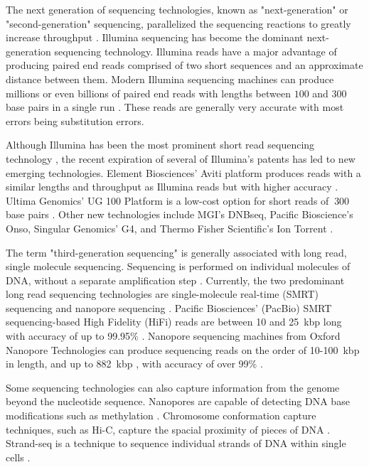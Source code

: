 \documentclass[11pt]{ucscthesis}
\begin{document}
The next generation of sequencing technologies, known as "next-generation" or "second-generation" sequencing, parallelized the sequencing reactions to greatly increase throughput \cite{sequencing_review_2016}. 
Illumina sequencing has become the dominant next-generation sequencing technology.
Illumina reads have a major advantage of producing paired end reads comprised of two short sequences and an approximate distance between them.
Modern Illumina sequencing machines can produce millions or even billions of paired end reads with lengths between $100$ and $300$ base pairs in a single run \cite{illumina_sequencing_nodate}.
These reads are generally very accurate with most errors being substitution errors.

Although Illumina has been the most prominent short read sequencing technology \cite{sr_review_2025}, the recent expiration of several of Illumina's patents has led to new emerging technologies.
Element Biosciences' Aviti platform produces reads with a similar lengths and throughput as Illumina reads but with higher accuracy \cite{element_sequencing_2024}. 
Ultima Genomics' UG 100 Platform is a low-cost option for short reads of $~300$ base pairs \cite{ultima_sequencing_2022}. 
Other new technologies include MGI's DNBseq, Pacific Bioscience's Onso, Singular Genomics' G4, and Thermo Fisher Scientific's Ion Torrent \cite{sr_review_2025}.

The term "third-generation sequencing" is generally associated with long read, single molecule sequencing.
Sequencing is performed on individual molecules of DNA, without a separate amplification step \cite{sequencing_review_2016}.
Currently, the two predominant long read sequencing technologies are single-molecule real-time (SMRT) sequencing and nanopore sequencing \cite{lr_review_2023}.
Pacific Biosciences' (PacBio) SMRT sequencing-based High Fidelity (HiFi) reads are between 10 and 25~kbp long with accuracy of up to 99.95\% \cite{pacbio_2019,lr_review_2023}.
Nanopore sequencing machines from Oxford Nanopore Technologies can produce sequencing reads on the order of 10-100~kbp in length, and up to 882~kbp \cite{nanopore_ultralong_2018}, with accuracy of over 99\% \cite{nanopore-fly-accuracy_2024, damaraju_long-read_2024}.

Some sequencing technologies can also capture information from the genome beyond the nucleotide sequence.
Nanopores are capable of detecting DNA base modifications such as methylation \cite{wang_nanopore_2021}. 
Chromosome conformation capture techniques, such as Hi-C, capture the spacial proximity of pieces of DNA \cite{lieberman_hic_2009}. 
Strand-seq is a technique to sequence individual strands of DNA within single cells \cite{sanders_strandseq_2017}.
\end{document}
